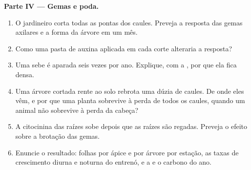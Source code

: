 \begin{problem}
\medskip
\noindent\textbf{Parte IV --- Gemas e poda.}
\begin{enumerate}[resume]
  \item O jardineiro corta todas as pontas dos caules. Preveja a
        resposta das gemas axilares e a forma da árvore em um mês.
  \item Como uma pasta de auxina aplicada em cada corte alteraria a
        resposta?
  \item Uma sebe é aparada seis vezes por ano. Explique, com a
        , por que ela fica densa.
  \item Uma árvore cortada rente ao solo rebrota uma dúzia de caules. De
        onde eles vêm, e por que uma planta sobrevive à perda de todos
        os caules, quando um animal não sobrevive à perda da cabeça?
  \item A citocinina das raízes sobe depois que as raízes são regadas.
        Preveja o efeito sobre a brotação das gemas.
  \item Enuncie o resultado: folhas por ápice e por árvore por estação,
        as taxas de crescimento diurna e noturna do entrenó, e a 
        e o carbono do ano.
\end{enumerate}
\end{problem}
